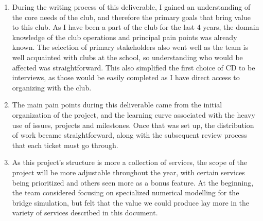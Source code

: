 \documentclass{article}
\begin{document}
\begin{enumerate}
    \item During the writing process of this deliverable, I gained an understanding of the core needs of the club, 
    and therefore the primary goals that bring value to this club. As I have been 
    a part of the club for the last 4 years, the domain knowledge of the club operations and principal 
    pain points was already known. The selection of primary stakeholders also went well as the team is well 
    acquainted with clubs at the school, so understanding who would be affected was straightforward. This also simplified 
    the first choice of CD to be interviews, as those would be easily completed as I have direct access to organizing with 
    the club.

    \item The main pain points during this deliverable came from the initial organization of the project, and 
    the learning curve associated with the heavy use of issues, projects and milestones. Once that was set up, 
    the distribution of work became straightforward, along with the subsequent review process that each ticket 
    must go through. 
    
    \item As this project's structure is more a collection of services, the scope of the project will be more adjustable throughout the year, 
    with certain services being prioritized and others seen more as a bonus feature. At the beginning, the team considered focusing on specialized 
    numerical modelling for the bridge simulation, but felt that the value we could produce lay more in the variety of services described 
    in this document.
\end{enumerate} 
\end{document}
